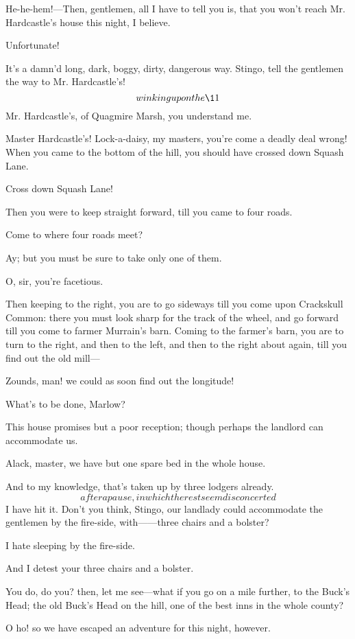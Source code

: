 \documentclass{book}
\begin{document}
\5  He-he-hem!---Then, gentlemen, all I have to tell you is, that you
won't reach Mr. Hardcastle's house this night, I believe.

\4  Unfortunate!

\5  It's a damn'd long, dark, boggy, dirty, dangerous way.  Stingo,
tell the gentlemen the way to Mr. Hardcastle's!  \[winking upon the
\11\]  Mr. Hardcastle's, of Quagmire Marsh, you understand me.

 Master Hardcastle's!  Lock-a-daisy, my masters, you're come
a deadly deal wrong!  When you came to the bottom of the hill, you
should have crossed down Squash Lane.

\2  Cross down Squash Lane!

  Then you were to keep straight forward, till you came to
four roads.

\2  Come to where four roads meet?

\5  Ay; but you must be sure to take only one of them.

\2  O, sir, you're facetious.

\5  Then keeping to the right, you are to go sideways till you come
upon Crackskull Common: there you must look sharp for the track of the
wheel, and go forward till you come to farmer Murrain's barn.  Coming
to the farmer's barn, you are to turn to the right, and then to the
left, and then to the right about again, till you find out the old
mill---

\2  Zounds, man! we could as soon find out the longitude!

\4  What's to be done, Marlow?

\2  This house promises but a poor reception; though perhaps the
landlord can accommodate us.

  Alack, master, we have but one spare bed in the whole
house.

\5  And to my knowledge, that's taken up by three lodgers already. 
\[after a pause, in which the rest seem disconcerted\] I have hit it. 
Don't you think, Stingo, our landlady could accommodate the gentlemen
by the fire-side, with------three chairs and a bolster?

\4  I hate sleeping by the fire-side.

\2  And I detest your three chairs and a bolster.

\5  You do, do you? then, let me see---what if you go on a mile
further, to the Buck's Head; the old Buck's Head on the hill, one of
the best inns in the whole county?

\4  O ho! so we have escaped an adventure for this night,
however.
\end{document}

